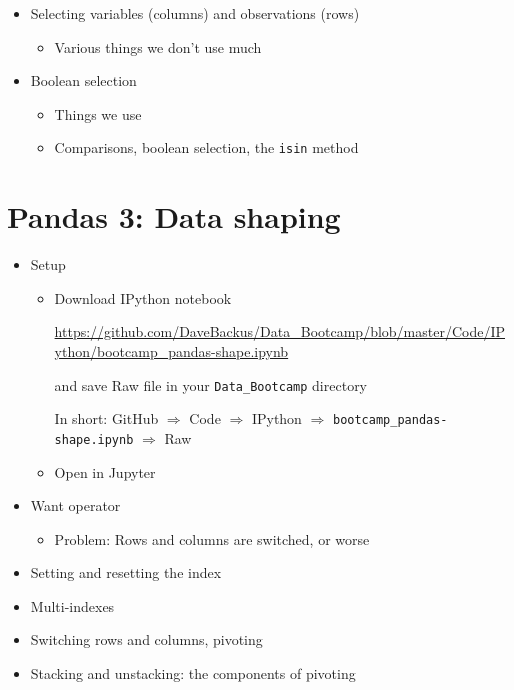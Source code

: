 \documentclass[11pt]{article}
\begin{document}
\begin{itemize}
\item Selecting variables (columns) and observations (rows)
\begin{itemize}
\item Various things we don't use much
\end{itemize}

\item Boolean selection
\begin{itemize}
\item Things we use
\item Comparisons, boolean selection, the {\tt isin} method
\end{itemize}



\end{itemize}


\section*{Pandas 3:  Data shaping}

\begin{itemize}
\item Setup
\begin{itemize}
\item Download IPython notebook

\url{https://github.com/DaveBackus/Data_Bootcamp/blob/master/Code/IPython/bootcamp_pandas-shape.ipynb}

and save Raw file in your \verb|Data_Bootcamp| directory

In short:  GitHub $\Rightarrow$ Code $\Rightarrow$ IPython $\Rightarrow$
 \verb|bootcamp_pandas-shape.ipynb| $\Rightarrow$ Raw

\item Open in Jupyter
\end{itemize}

\item Want operator
\begin{itemize}
\item Problem:  Rows and columns are switched, or worse
\end{itemize}

\item Setting and resetting the index
\item Multi-indexes
\item Switching rows and columns, pivoting
\item Stacking and unstacking:  the components of pivoting
\end{itemize}
\end{document}
